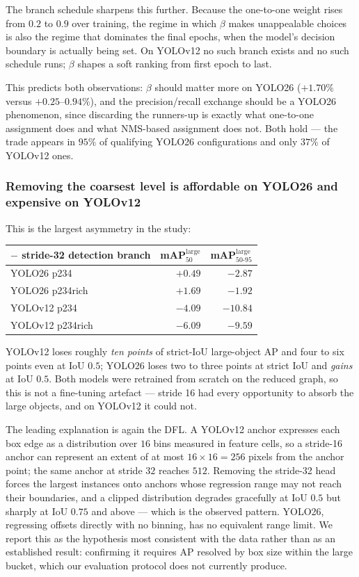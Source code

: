\documentclass[10pt,twocolumn,a4paper]{article}
\begin{document}
The branch schedule sharpens this further. Because the one-to-one weight rises
from $0.2$ to $0.9$ over training, the regime in which $\beta$ makes
unappealable choices is also the regime that dominates the final epochs, when the
model's decision boundary is actually being set. On YOLOv12 no such branch
exists and no such schedule runs; $\beta$ shapes a soft ranking from first epoch
to last.

This predicts both observations: $\beta$ should matter more on YOLO26
($+1.70\%$ versus $+0.25$--$0.94\%$), and the precision/recall exchange should be
a YOLO26 phenomenon, since discarding the runners-up is exactly what one-to-one
assignment does and what NMS-based assignment does not. Both hold --- the trade
appears in $95\%$ of qualifying YOLO26 configurations and only $37\%$ of
YOLOv12 ones.

\subsubsection{Removing the coarsest level is affordable on YOLO26 and
expensive on YOLOv12}

This is the largest asymmetry in the study:

\begin{center}\small
\begin{tabular}{@{}lrr@{}}
\toprule
$-$ stride-32 detection branch & mAP$_{50}^{\text{large}}$ & mAP$_{50\text{-}95}^{\text{large}}$ \\
\midrule
YOLO26 \;\;p234        & $+0.49$ & $-2.87$ \\
YOLO26 \;\;p234rich    & $+1.69$ & $-1.92$ \\
YOLOv12 \;p234         & $-4.09$ & $-10.84$ \\
YOLOv12 \;p234rich     & $-6.09$ & $-9.59$ \\
\bottomrule
\end{tabular}
\end{center}

YOLOv12 loses roughly \emph{ten points} of strict-IoU large-object AP and four
to six points even at IoU $0.5$; YOLO26 loses two to three points at strict IoU
and \emph{gains} at IoU $0.5$. Both models were retrained from scratch on the
reduced graph, so this is not a fine-tuning artefact --- stride 16 had every
opportunity to absorb the large objects, and on YOLOv12 it could not.

The leading explanation is again the DFL. A YOLOv12 anchor expresses each box
edge as a distribution over $16$ bins measured in feature cells, so a stride-16
anchor can represent an extent of at most $16 \times 16 = 256$ pixels from the
anchor point; the same anchor at stride $32$ reaches $512$. Removing the
stride-32 head forces the largest instances onto anchors whose regression range
may not reach their boundaries, and a clipped distribution degrades gracefully
at IoU $0.5$ but sharply at IoU $0.75$ and above --- which is the observed
pattern. YOLO26, regressing offsets directly with no binning, has no equivalent
range limit. We report this as the hypothesis most consistent with the data
rather than as an established result: confirming it requires AP resolved by box
size within the large bucket, which our evaluation protocol does not currently
produce.
\end{document}
